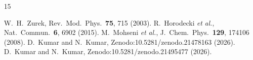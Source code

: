 \documentclass[aps,njp,twocolumn,showpacs,superscriptaddress]{revtex4-2}
\begin{document}
\FloatBarrier
\begin{thebibliography}{15}

 W.\ H.\ Zurek, Rev.\ Mod.\ Phys.\ \textbf{75}, 715 (2003).
 R.\ Horodecki \textit{et al.}, Nat.\ Commun.\ \textbf{6}, 6902 (2015).
 M.\ Mohseni \textit{et al.}, J.\ Chem.\ Phys.\ \textbf{129}, 174106 (2008).
 D.\ Kumar and N.\ Kumar, Zenodo:10.5281/zenodo.21478163 (2026).
 D.\ Kumar and N.\ Kumar, Zenodo:10.5281/zenodo.21495477 (2026).

\end{thebibliography}
\end{document}

